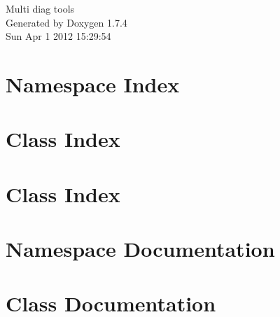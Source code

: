 \documentclass[a4paper]{book}
\begin{document}
\hypersetup{pageanchor=false}
\begin{titlepage}
\vspace*{7cm}
\begin{center}
{\Large Multi diag tools }\\
\vspace*{1cm}
{\large Generated by Doxygen 1.7.4}\\
\vspace*{0.5cm}
{\small Sun Apr 1 2012 15:29:54}\\
\end{center}
\end{titlepage}
\clearemptydoublepage
{}
\tableofcontents
\clearemptydoublepage
{}
\hypersetup{pageanchor=true}
\chapter{Namespace Index}

\chapter{Class Index}

\chapter{Class Index}

\chapter{Namespace Documentation}

\chapter{Class Documentation}





































\printindex
\end{document}
